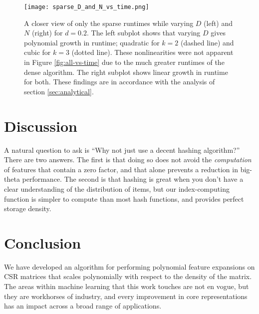 \documentclass{article}
\begin{document}
\begin{figure*}[ht!]
\vskip 0.2in
\begin{center}
\centerline{\texttt{[image: sparse\_D\_and\_N\_vs\_time.png]}}
\caption{A closer view of only the sparse runtimes while varying $D$ (left) and $N$ (right) for $d = 0.2$. The left subplot shows that varying $D$ gives polynomial growth in runtime; quadratic for $k = 2$ (dashed line) and cubic for $k = 3$ (dotted line). These nonlinearities were not apparent in Figure \ref{fig:all-vs-time} due to the much greater runtimes of the dense algorithm. The right subplot shows linear growth in runtime for both. These findings are in accordance with the analysis of section \ref{sec:analytical}.}
\label{fig:sparse_D_and_N_vs_time}
\end{center}
\vskip -0.2in
\end{figure*}

\section{Discussion}
A natural question to ask is ``Why not just use a decent hashing algorithm?'' There are two answers. The first is that doing so does not avoid the \emph{computation} of features that contain a zero factor, and that alone prevents a reduction in big-theta performance. The second is that hashing is great when you don't have a clear understanding of the distribution of items, but our index-computing function is simpler to compute than most hash functions, and provides perfect storage density. 

\section{Conclusion}
We have developed an algorithm for performing polynomial feature expansions on CSR matrices that scales polynomially with respect to the density of the matrix.
The areas within machine learning that this work touches are not en vogue, but they are workhorses of industry, and every improvement in core representations has an impact across a broad range of applications. 

\newpage



\end{document}
